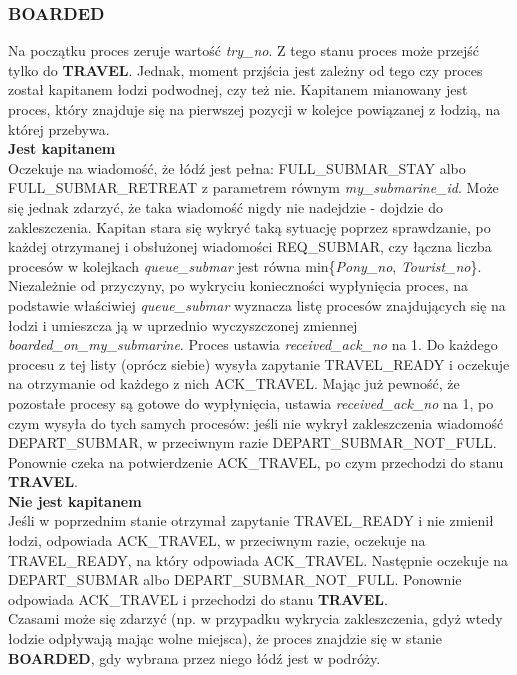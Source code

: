 \documentclass[a4paper]{article}
\begin{document}
\subsubsection{\textbf{BOARDED}}
Na początku proces zeruje wartość \textit{try\_no}.
Z tego stanu proces może przejść tylko do \textbf{TRAVEL}. Jednak, moment przjścia jest zależny od tego czy proces został kapitanem łodzi podwodnej,
czy też nie. Kapitanem mianowany jest proces, który znajduje się na pierwszej pozycji w kolejce powiązanej z łodzią, na której przebywa.
\\
\textbf{Jest kapitanem}\\
Oczekuje na wiadomość, że łódź jest pełna: FULL\_SUBMAR\_STAY albo
\\ FULL\_SUBMAR\_RETREAT z parametrem równym \textit{my\_submarine\_id}.
Może się jednak zdarzyć, że taka wiadomość nigdy nie nadejdzie - dojdzie do zakleszczenia. Kapitan stara się wykryć taką sytuację poprzez sprawdzanie,
po każdej otrzymanej i obsłużonej wiadomości REQ\_SUBMAR, czy łączna liczba procesów w kolejkach \textit{queue\_submar} jest równa
min\{\textit{Pony\_no}, \textit{Tourist\_no}\}.\\
Niezależnie od przyczyny, po wykryciu konieczności wypłynięcia proces, na podstawie właściwiej \textit{queue\_submar} wyznacza listę procesów znajdujących się na łodzi i umieszcza ją w uprzednio
wyczyszczonej zmiennej \textit{boarded\_on\_my\_submarine}. Proces ustawia \textit{received\_ack\_no} na 1. Do każdego procesu z tej listy (oprócz siebie) wysyła zapytanie TRAVEL\_READY i oczekuje na otrzymanie od każdego z nich ACK\_TRAVEL.
Mając już pewność, że pozostałe procesy są gotowe do wypłynięcia, ustawia \textit{received\_ack\_no} na 1, po czym wysyła do tych samych procesów: jeśli nie wykrył zakleszczenia wiadomość DEPART\_SUBMAR,
w przeciwnym razie DEPART\_SUBMAR\_NOT\_FULL. Ponownie czeka na potwierdzenie ACK\_TRAVEL, po czym przechodzi do stanu \textbf{TRAVEL}.
\\
\textbf{Nie jest kapitanem}\\
Jeśli w poprzednim stanie otrzymał zapytanie TRAVEL\_READY i nie zmienił łodzi, odpowiada ACK\_TRAVEL, w przeciwnym razie,
oczekuje na TRAVEL\_READY, na który odpowiada ACK\_TRAVEL. Następnie oczekuje na DEPART\_SUBMAR albo DEPART\_SUBMAR\_NOT\_FULL. Ponownie odpowiada ACK\_TRAVEL i przechodzi do stanu \textbf{TRAVEL}.\\
Czasami może się zdarzyć (np. w przypadku wykrycia zakleszczenia, gdyż wtedy łodzie odpływają mając wolne miejsca), że proces znajdzie się w stanie \textbf{BOARDED}, gdy wybrana przez niego łódź jest w podróży.
\end{document}
